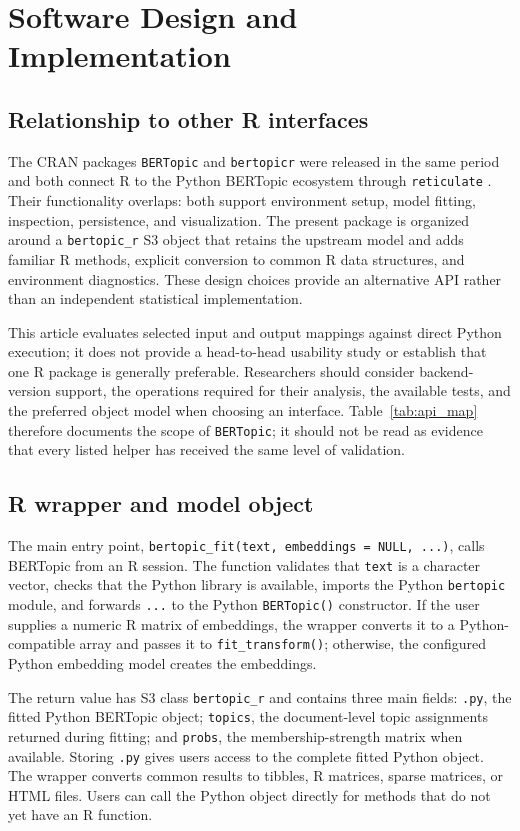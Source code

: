 \documentclass[12pt]{article}
\newcommand{\pkg}[1]{\texttt{#1}}
\newcommand{\code}[1]{\texttt{#1}}
\begin{document}
\section{Software Design and Implementation}

\subsection{Relationship to other R interfaces}

The CRAN packages \pkg{BERTopic} and \pkg{bertopicr} were released in the same period and both connect R to the Python BERTopic ecosystem through \pkg{reticulate} \citep{petric2026bertopicr}. Their functionality overlaps: both support environment setup, model fitting, inspection, persistence, and visualization. The present package is organized around a \code{bertopic\_r} S3 object that retains the upstream model and adds familiar R methods, explicit conversion to common R data structures, and environment diagnostics. These design choices provide an alternative API rather than an independent statistical implementation.

This article evaluates selected input and output mappings against direct Python execution; it does not provide a head-to-head usability study or establish that one R package is generally preferable. Researchers should consider backend-version support, the operations required for their analysis, the available tests, and the preferred object model when choosing an interface. Table~\ref{tab:api_map} therefore documents the scope of \pkg{BERTopic}; it should not be read as evidence that every listed helper has received the same level of validation.

\subsection{R wrapper and model object}

The main entry point, \code{bertopic\_fit(text, embeddings = NULL, ...)}, calls BERTopic from an R session. The function validates that \code{text} is a character vector, checks that the Python library is available, imports the Python \code{bertopic} module, and forwards \code{...} to the Python \code{BERTopic()} constructor. If the user supplies a numeric R matrix of embeddings, the wrapper converts it to a Python-compatible array and passes it to \code{fit\_transform()}; otherwise, the configured Python embedding model creates the embeddings.

The return value has S3 class \code{bertopic\_r} and contains three main fields: \code{.py}, the fitted Python BERTopic object; \code{topics}, the document-level topic assignments returned during fitting; and \code{probs}, the membership-strength matrix when available. Storing \code{.py} gives users access to the complete fitted Python object. The wrapper converts common results to tibbles, R matrices, sparse matrices, or HTML files. Users can call the Python object directly for methods that do not yet have an R function.
\end{document}

